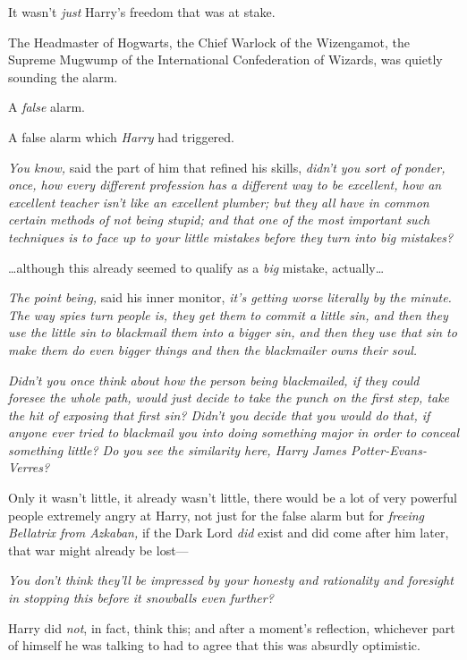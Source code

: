 It wasn't \emph{just} Harry's freedom that was at stake.

The Headmaster of Hogwarts, the Chief Warlock of the Wizengamot, the Supreme Mugwump of the International Confederation of Wizards, was quietly sounding the alarm.

A \emph{false} alarm.

A false alarm which \emph{Harry} had triggered.

\emph{You know,} said the part of him that refined his skills, \emph{didn't you sort of ponder, once, how every different profession has a different way to be excellent, how an excellent teacher isn't like an excellent plumber; but they all have in common certain methods of not being stupid; and that one of the most important such techniques is to face up to your little mistakes before they turn into \emph{big} mistakes?}

{\ldots}although this already seemed to qualify as a \emph{big} mistake, actually{\ldots}

\emph{The point being,} said his inner monitor, \emph{it's getting worse literally by the minute. The way spies turn people is, they get them to commit a little sin, and then they use the little sin to blackmail them into a bigger sin, and then they use \emph{that} sin to make them do even bigger things and then the blackmailer owns their soul.}

\emph{Didn't you once think about how the person being blackmailed, if they could foresee the whole path, would just decide to take the punch on the first step, take the hit of exposing that first sin? Didn't you decide that you would do that, if anyone ever tried to blackmail you into doing something major in order to conceal something little? Do you see the similarity here, Harry James Potter-Evans-Verres?}

Only it wasn't little, it already wasn't little, there would be a lot of very powerful people extremely angry at Harry, not just for the false alarm but for \emph{freeing Bellatrix from Azkaban,} if the Dark Lord \emph{did} exist and did come after him later, that war might already be lost---

\emph{You don't think they'll be impressed by your honesty and rationality and foresight in stopping this before it snowballs even further?}

Harry did \emph{not}, in fact, think this; and after a moment's reflection, whichever part of himself he was talking to had to agree that this was absurdly optimistic.

